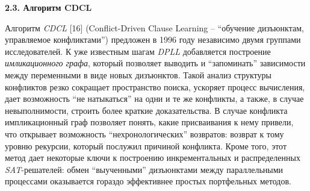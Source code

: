 \vspace{5pt}
\textbf{2.3. Алгоритм CDCL}\label{chapters:2.3}
\vspace{5pt}

Алгоритм \textit{CDCL} [16] (Conflict-Driven Clause Learning – \enquote{обучение дизъюнктам, управляемое конфликтами}) предложен в 1996 году независимо двумя группами исследователей. К уже известным шагам \textit{DPLL} добавляется построение \textit{имликационного графа}, который позволяет выводить и \enquote{запоминать} зависимости между переменными в виде новых дизъюнктов. Такой анализ структуры конфликтов резко сокращает пространство поиска, ускоряет процесс вычисления, дает возможность \enquote{не натыкаться} на одни и те же конфликты, а также, в случае невыполнимости, строить более краткие доказательства. В случае конфликта импликационный граф позволяет понять, какие присваивания к нему привели, что открывает возможность \enquote{нехронологических} возвратов: возврат к тому уровню рекурсии, который послужил причиной конфликта. Кроме того, этот метод дает некоторые ключи к построению инкрементальных и распределенных \textit{SAT}-решателей: обмен \enquote{выученными} дизъюнктами между параллельными процессами оказывается гораздо эффективнее простых портфельных методов.

